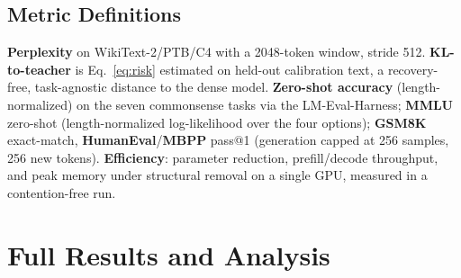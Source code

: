 \subsection{Metric Definitions}
\label{app:metrics}
\textbf{Perplexity} on WikiText-2/PTB/C4 with a 2048-token window, stride 512.
\textbf{KL-to-teacher} is Eq.~\eqref{eq:risk} estimated on held-out calibration text, a recovery-free,
task-agnostic distance to the dense model. \textbf{Zero-shot accuracy} (length-normalized) on the
seven commonsense tasks via the LM-Eval-Harness; \textbf{MMLU} zero-shot (length-normalized
log-likelihood over the four options); \textbf{GSM8K} exact-match,
\textbf{HumanEval}/\textbf{MBPP} pass@1 (generation capped at 256 samples, 256 new tokens).
\textbf{Efficiency}: parameter reduction, prefill/decode throughput, and peak memory under structural
removal on a single GPU, measured in a contention-free run.

\section{Full Results and Analysis}\label{app:presults}

